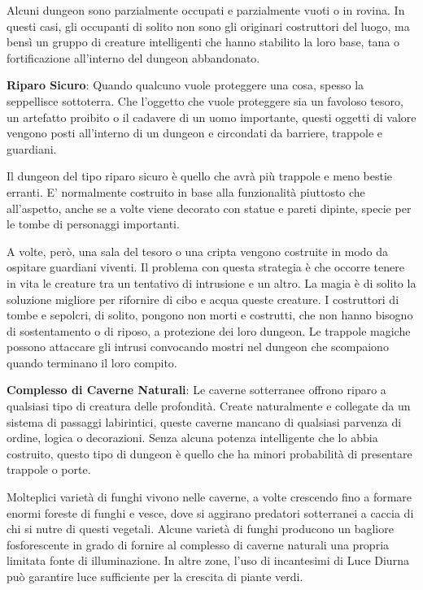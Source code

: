 \begin{multicols}{2}
Alcuni dungeon sono parzialmente occupati e parzialmente vuoti o in rovina. In questi casi, gli occupanti di solito non sono gli originari costruttori del luogo, ma bensì un gruppo di creature intelligenti che hanno stabilito la loro base, tana o fortificazione all'interno del dungeon abbandonato.

\textbf{Riparo Sicuro}: Quando qualcuno vuole proteggere una cosa, spesso la seppellisce sottoterra. Che l'oggetto che vuole proteggere sia un favoloso tesoro, un artefatto proibito o il cadavere di un uomo importante, questi oggetti di valore vengono posti all'interno di un dungeon e circondati da barriere, trappole e guardiani.

Il dungeon del tipo riparo sicuro è quello che avrà più trappole e meno bestie erranti. E' normalmente costruito in base alla funzionalità piuttosto che all'aspetto, anche se a volte viene decorato con statue e pareti dipinte, specie per le tombe di personaggi importanti.


A volte, però, una sala del tesoro o una cripta vengono costruite in modo da ospitare guardiani viventi. Il problema con questa strategia è che occorre tenere in vita le creature tra un tentativo di intrusione e un altro. La magia è di solito la soluzione migliore per rifornire di cibo e acqua queste creature. I costruttori di tombe e sepolcri, di solito, pongono non morti e costrutti, che non hanno bisogno di sostentamento o di riposo, a protezione dei loro dungeon. Le trappole magiche possono attaccare gli intrusi convocando mostri nel dungeon che scompaiono quando terminano il loro compito.

\textbf{Complesso di Caverne Naturali}: Le caverne sotterranee offrono riparo a qualsiasi tipo di creatura delle profondità. Create naturalmente e collegate da un sistema di passaggi labirintici, queste caverne mancano di qualsiasi parvenza di ordine, logica o decorazioni. Senza alcuna potenza intelligente che lo abbia costruito, questo tipo di dungeon è quello che ha minori probabilità di presentare trappole o porte.

Molteplici varietà di funghi vivono nelle caverne, a volte crescendo fino a formare enormi foreste di funghi e vesce, dove si aggirano predatori sotterranei a caccia di chi si nutre di questi vegetali. Alcune varietà di funghi producono un bagliore fosforescente in grado di fornire al complesso di caverne naturali una propria limitata fonte di illuminazione. In altre zone, l'uso di incantesimi di Luce Diurna può garantire luce sufficiente per la crescita di piante verdi.


\end{multicols}
